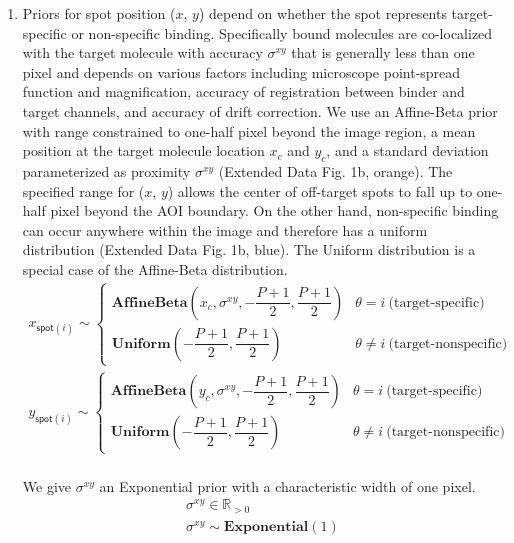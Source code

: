 \begin{enumerate}
\item Priors for spot position ($x$, $y$) depend on whether the spot represents target-specific or non-specific binding. Specifically bound molecules are co-localized with the target molecule with accuracy $\sigma^{xy}$ that is generally less than one pixel and depends on various factors including microscope point-spread function and magnification, accuracy of registration between binder and target channels, and accuracy of drift correction. We use an Affine-Beta prior with range constrained to one-half pixel beyond the image region, a mean position at the target molecule location $x_c$ and $y_c$, and a standard deviation parameterized as proximity $\sigma^{xy}$ (Extended Data Fig. 1b, orange). The specified range for ($x$, $y$) allows the center of off-target spots to fall up to one-half pixel beyond the AOI boundary. On the other hand, non-specific binding can occur anywhere within the image and therefore has a uniform distribution (Extended Data Fig. 1b, blue). The Uniform distribution is a special case of the Affine-Beta distribution.
%
\begin{gather*}
    x_{\mathsf{spot}(i)} \sim
    \begin{cases}
        \mathbf{AffineBeta}\left( x_c, \sigma^{xy}, -\dfrac{P+1}{2}, \dfrac{P+1}{2} \right) & \theta = i ~\textrm{(target-specific)} \\
        \mathbf{Uniform}\left(-\dfrac{P+1}{2}, \dfrac{P+1}{2} \right) & \theta \neq i ~\text{(target-nonspecific)}
    \end{cases} \\
    y_{\mathsf{spot}(i)} \sim
    \begin{cases}
        \mathbf{AffineBeta}\left( y_c, \sigma^{xy}, -\dfrac{P+1}{2}, \dfrac{P+1}{2} \right) & \theta = i ~\textrm{(target-specific)} \\
        \mathbf{Uniform}\left(-\dfrac{P+1}{2}, \dfrac{P+1}{2} \right) & \theta \neq i ~\text{(target-nonspecific)}
    \end{cases} \\
\end{gather*}

We give $\sigma^{xy}$ an Exponential prior with a characteristic width of one pixel.
%
\begin{gather*}
    \sigma^{xy} \in \mathbb{R}_{>0} \\
    \sigma^{xy} \sim \mathbf{Exponential}(1) \\
\end{gather*}


\end{enumerate}
